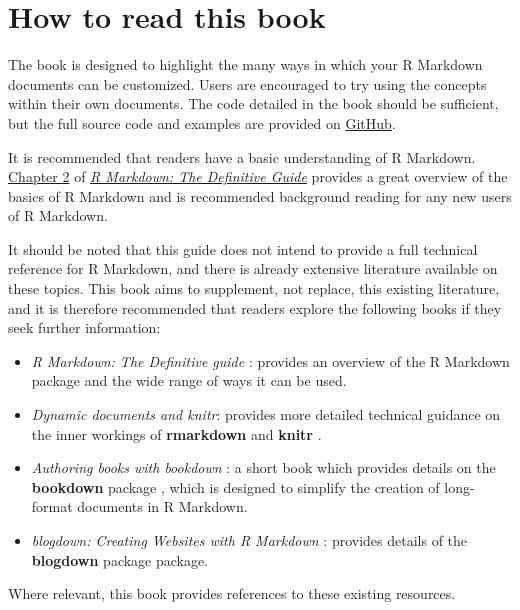 \documentclass[]{book}
\providecommand{\tightlist}{%
  \setlength{\itemsep}{0pt}\setlength{\parskip}{0pt}}
\begin{document}
\section*{How to read this book}\label{how-to-read-this-book}

The book is designed to highlight the many ways in which your R Markdown
documents can be customized. Users are encouraged to try using the
concepts within their own documents. The code detailed in the book
should be sufficient, but the full source code and examples are provided
on \href{https://github.com/mikey-harper/rmarkdown-cookbook}{GitHub}.

It is recommended that readers have a basic understanding of R Markdown.
\href{https://bookdown.org/yihui/rmarkdown/basics.html}{Chapter 2} of
\href{https://bookdown.org/yihui/rmarkdown/}{\emph{R Markdown: The
Definitive Guide}} \citep{xie2018} provides a great overview of the
basics of R Markdown and is recommended background reading for any new
users of R Markdown.

It should be noted that this guide does not intend to provide a full
technical reference for R Markdown, and there is already extensive
literature available on these topics. This book aims to supplement, not
replace, this existing literature, and it is therefore recommended that
readers explore the following books if they seek further information:

\begin{itemize}
\tightlist
\item
  \emph{R Markdown: The Definitive guide} \citep{xie2018}: provides an
  overview of the R Markdown package and the wide range of ways it can
  be used.
\item
  \emph{Dynamic documents and knitr}: provides more detailed technical
  guidance on the inner workings of \textbf{rmarkdown} and
  \textbf{knitr} \citep{R-knitr}.
\item
  \emph{Authoring books with bookdown} \citep{xie2016bookdown}: a short
  book which provides details on the \textbf{bookdown} package
  \citep{R-bookdown}, which is designed to simplify the creation of
  long-format documents in R Markdown.
\item
  \emph{blogdown: Creating Websites with R Markdown}
  \citep{xie2017blogdown}: provides details of the \textbf{blogdown}
  package \citep{R-blogdown} package.
\end{itemize}

Where relevant, this book provides references to these existing
resources.
\end{document}
